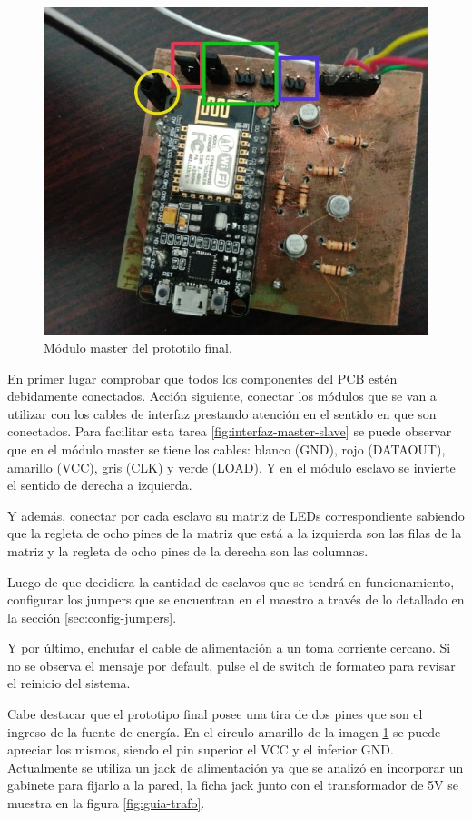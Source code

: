 \begin{figure}[!ht]
	\centering
	\includegraphics[width=0.8\linewidth]{imagenes/guia/master-rec.jpg}
	\caption{Módulo master del prototilo final.}
	\label{fig:guia-master}
\end{figure}

En primer lugar comprobar que todos los componentes del PCB estén debidamente conectados. Acción siguiente, conectar los módulos que se van a utilizar con los cables de interfaz prestando atención en el sentido en que son conectados.
Para facilitar esta tarea \ref{fig:interfaz-master-slave} se puede observar que en el módulo master se tiene los cables: blanco (GND), rojo (DATAOUT), amarillo (VCC), gris (CLK) y verde (LOAD). Y en el módulo esclavo se invierte el sentido de derecha a izquierda.

Y además, conectar por cada esclavo su matriz de LEDs correspondiente sabiendo que la regleta de ocho pines de la matriz que está a la izquierda son las filas de la matriz y la regleta de ocho pines de la derecha son las columnas.

Luego de que decidiera la cantidad de esclavos que se tendrá en funcionamiento, configurar los jumpers que se encuentran en el maestro a través de lo detallado en la sección \ref{sec:config-jumpers}.

Y por último, enchufar el cable de alimentación a un toma corriente cercano. Si no se observa el mensaje por default, pulse el de switch de formateo para revisar el reinicio del sistema.

Cabe destacar que el prototipo final posee una tira de dos pines que son el ingreso de la fuente de energía. En el circulo amarillo de la imagen \ref{fig:guia-master} se puede apreciar los mismos, siendo el pin superior el VCC y el inferior GND. Actualmente se utiliza un jack de alimentación ya que se analizó en incorporar un gabinete para fijarlo a la pared, la ficha jack junto con el transformador de 5V se muestra en la figura \ref{fig:guia-trafo}.

